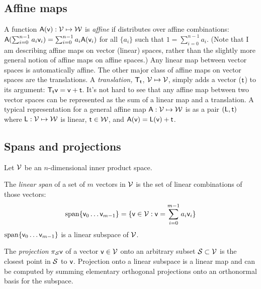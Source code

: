 
\subsection{Affine maps}
\label{sec:affine-maps}

A function $\mathsf{A}(\mathsf{v}):\mathcal{V} \mapsto \mathcal{W}$
is {\it affine} if distributes over affine combinations:
$\mathsf{A}(\sum_{i=0}^{n-1} a_i \mathsf{v}_i) = \sum_{i=0}^{n-1} a_i \mathsf{A}(\mathsf{v}_i) $
for all $\{a_i\}$ such that $1 = \sum_{i=0}^{n-1} a_i$.
(Note that I am describing affine maps on vector (linear) spaces,
rather than the slightly more general notion of affine maps on affine spaces.)
Any linear map between vector spaces is automatically affine.
The other major class of affine maps on vector spaces are the translations.
A {\it translation,} $\mathsf{T}_{\mathsf{t}}$, $\mathcal{V} \mapsto \mathcal{V}$,
simply adds a vector ($\mathsf{t}$) to its argument:
$\mathsf{T}_{\mathsf{t}} \mathsf{v} = \mathsf{v} + \mathsf{t}$.
It's not hard to see that any affine map between two vector spaces
can be represented as the sum of a linear map and a translation.
A typical representation for a general affine map $\mathsf{A} : \mathcal{V} \mapsto \mathcal{W}$
is as a pair $(\mathsf{L},\mathsf{t})$ where $\mathsf{L} : \mathcal{V} \mapsto \mathcal{W}$ is linear,
$\mathsf{t} \in \mathcal{W}$, and $\mathsf{A}(\mathsf{v}) = \mathsf{L}(\mathsf{v}) + \mathsf{t}$.


\subsection{Spans and projections}
\label{sec:spans-and-projections}

Let $\mathcal{V}$ be an $n$-dimensional inner product space.

The {\it linear span} of a set of $m$ vectors in $\mathcal{V}$
is the set of linear combinations of those vectors:
\begin{equation}
\linear_span\{ \v_0 \ldots \v_{m-1} \} = \{\v \in \Vspace : \v = \sum_{i=0}^{m-1} a_i \v_i\}
\end{equation}
$\linear_span\{ \v_0 \ldots \v_{m-1} \}$ is a linear subspace of $\mathcal{V}$.

The {\it projection} $\pi_{\mathcal{S}} \mathsf{v}$ of a vector $\mathsf{v} \in \mathcal{V}$
onto an arbitrary subset $\mathcal{S} \subset \mathcal{V}$
is the closest point in $\mathcal{S}$ to $\mathsf{v}$.
Projection onto a linear subspace is a linear map and
can be computed by summing
elementary orthogonal projections onto an orthonormal basis for the subspace.

